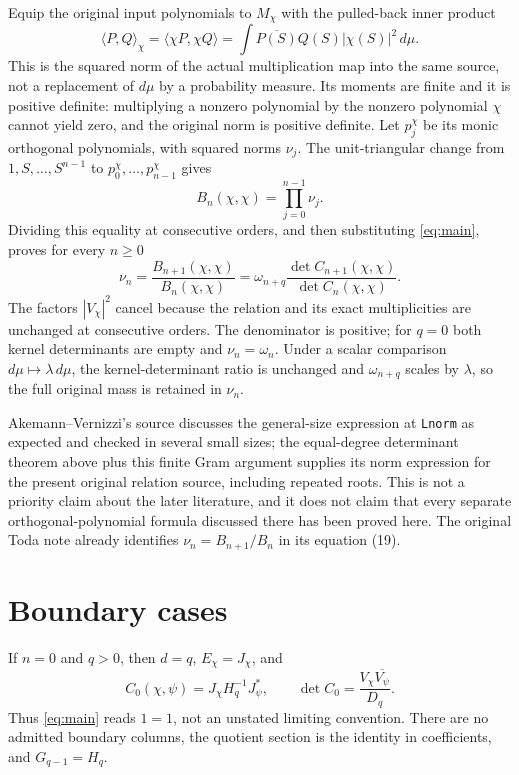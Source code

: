 \documentclass[11pt]{article}
\begin{document}
Equip the original input polynomials to \(M_\chi\) with the pulled-back
inner product
\[
 \langle P,Q\rangle_\chi=\langle\chi P,\chi Q\rangle
 =\int\overline{P(S)}Q(S)|\chi(S)|^2\,d\mu.
\]
This is the squared norm of the actual multiplication map into the same
source, not a replacement of \(d\mu\) by a probability measure. Its
moments are finite and it is positive definite: multiplying a nonzero
polynomial by the nonzero polynomial \(\chi\) cannot yield zero, and
the original norm is positive definite. Let \(p_j^\chi\) be its monic
orthogonal polynomials, with squared norms \(\nu_j\).
The unit-triangular change from \(1,S,\ldots,S^{n-1}\) to
\(p_0^\chi,\ldots,p_{n-1}^\chi\) gives
\[
 B_n(\chi,\chi)=\prod_{j=0}^{n-1}\nu_j.
\]
Dividing this equality at consecutive orders, and then substituting
\eqref{eq:main}, proves for every \(n\geq0\)
\begin{equation}\label{eq:relationnorm}
 \boxed{\nu_n=\frac{B_{n+1}(\chi,\chi)}{B_n(\chi,\chi)}
       =\omega_{n+q}
          \frac{\det C_{n+1}(\chi,\chi)}
               {\det C_n(\chi,\chi)}.}
\end{equation}
The factors \(|V_\chi|^2\) cancel because the relation and its exact
multiplicities are unchanged at consecutive orders. The denominator
is positive; for \(q=0\) both kernel determinants are empty and
\(\nu_n=\omega_n\). Under a scalar comparison
\(d\mu\mapsto\lambda\,d\mu\), the kernel-determinant ratio is
unchanged and \(\omega_{n+q}\) scales by \(\lambda\), so the full
original mass is retained in \(\nu_n\).

Akemann--Vernizzi's source discusses the general-size expression at
\texttt{Lnorm} as expected and checked in several small sizes; the
equal-degree determinant theorem above plus this finite Gram argument
supplies its norm expression for the present original relation source,
including repeated roots. This is not a priority claim about the later
literature, and it does not claim that every separate orthogonal-polynomial
formula discussed there has been proved here. The original Toda note
already identifies \(\nu_n=B_{n+1}/B_n\) in its equation (19).

\section{Boundary cases}\label{sec:boundary}

If \(n=0\) and \(q>0\), then \(d=q\), \(E_\chi=J_\chi\), and
\[
 C_0(\chi,\psi)=J_\chi H_q^{-1}J_\psi^*,\qquad
 \det C_0=\frac{V_\chi\overline{V_\psi}}{D_q}.
\]
Thus \eqref{eq:main} reads \(1=1\), not an unstated limiting convention.
There are no admitted boundary columns, the quotient section is the
identity in coefficients, and \(G_{q-1}=H_q\).
\end{document}
